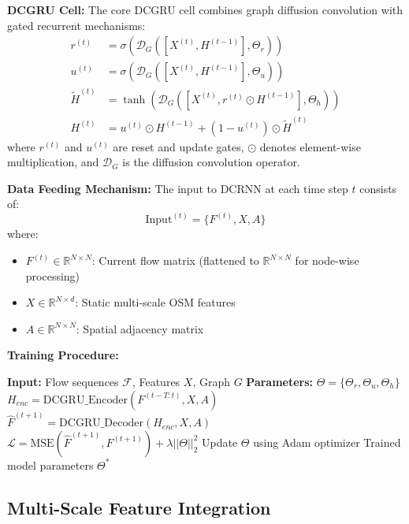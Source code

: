\documentclass[twocolumn,11pt]{IEEEtran}
\begin{document}
\textbf{DCGRU Cell:}
The core DCGRU cell combines graph diffusion convolution with gated recurrent mechanisms:
\begin{align}
r^{(t)} &= \sigma(\mathcal{D}_G([X^{(t)}, H^{(t-1)}], \Theta_r)) \\
u^{(t)} &= \sigma(\mathcal{D}_G([X^{(t)}, H^{(t-1)}], \Theta_u)) \\
\tilde{H}^{(t)} &= \tanh(\mathcal{D}_G([X^{(t)}, r^{(t)} \odot H^{(t-1)}], \Theta_h)) \\
H^{(t)} &= u^{(t)} \odot H^{(t-1)} + (1 - u^{(t)}) \odot \tilde{H}^{(t)}
\end{align}
where $r^{(t)}$ and $u^{(t)}$ are reset and update gates, $\odot$ denotes element-wise multiplication, and $\mathcal{D}_G$ is the diffusion convolution operator.

\textbf{Data Feeding Mechanism:}
The input to DCRNN at each time step $t$ consists of:
\begin{equation}
\text{Input}^{(t)} = \{F^{(t)}, X, A\}
\end{equation}
where:
\begin{itemize}
\item $F^{(t)} \in \mathbb{R}^{N \times N}$: Current flow matrix (flattened to $\mathbb{R}^{N \times N}$ for node-wise processing)
\item $X \in \mathbb{R}^{N \times d}$: Static multi-scale OSM features
\item $A \in \mathbb{R}^{N \times N}$: Spatial adjacency matrix
\end{itemize}

\textbf{Training Procedure:}
\begin{algorithm}[h]
\caption{DCRNN Training with Multi-Scale Features}
\begin{algorithmic}[1]
\STATE \textbf{Input:} Flow sequences $\mathcal{F}$, Features $X$, Graph $G$
\STATE \textbf{Parameters:} $\Theta = \{\Theta_r, \Theta_u, \Theta_h\}$
        \STATE $H_{enc} = \text{DCGRU\_Encoder}(F^{(t-T:t)}, X, A)$
        \STATE $\hat{F}^{(t+1)} = \text{DCGRU\_Decoder}(H_{enc}, X, A)$
        \STATE $\mathcal{L} = \text{MSE}(\hat{F}^{(t+1)}, F^{(t+1)}) + \lambda ||\Theta||_2^2$
        \STATE Update $\Theta$ using Adam optimizer
    \ENDFOR
\ENDFOR
\RETURN Trained model parameters $\Theta^*$
\end{algorithmic}
\end{algorithm}

\subsection{Multi-Scale Feature Integration}
\end{document}
